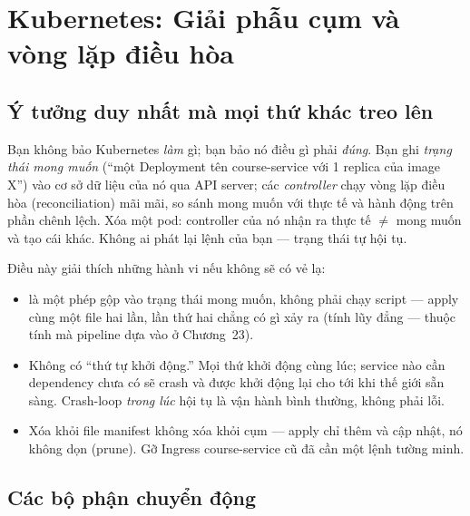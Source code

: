 \chapter{Kubernetes: Giải phẫu cụm và vòng lặp điều hòa}
\label{ch:cluster}

\section{Ý tưởng duy nhất mà mọi thứ khác treo lên}

Bạn không bảo Kubernetes \emph{làm} gì; bạn bảo nó điều gì phải
\emph{đúng}. Bạn ghi \emph{trạng thái mong muốn} (``một Deployment tên
course-service với 1 replica của image X'') vào cơ sở dữ liệu của nó
qua API server; các \emph{controller} chạy vòng lặp điều hòa
(reconciliation) mãi mãi, so sánh mong muốn với thực tế và hành động
trên phần chênh lệch. Xóa một pod: controller của nó nhận ra thực tế
$\neq$ mong muốn và tạo cái khác. Không ai phát lại lệnh của bạn ---
trạng thái tự hội tụ.

Điều này giải thích những hành vi nếu không sẽ có vẻ lạ:

\begin{itemize}
  \item {} là một phép gộp vào trạng thái mong muốn,
  không phải chạy script --- apply cùng một file hai lần, lần thứ hai
  chẳng có gì xảy ra (tính lũy đẳng --- thuộc tính mà pipeline dựa vào
  ở Chương~23).
  \item Không có ``thứ tự khởi động.'' Mọi thứ khởi động cùng lúc;
  service nào cần dependency chưa có sẽ crash và được khởi động lại cho
  tới khi thế giới sẵn sàng. Crash-loop \emph{trong lúc} hội tụ là vận
  hành bình thường, không phải lỗi.
  \item Xóa khỏi file manifest không xóa khỏi cụm --- apply chỉ thêm và
  cập nhật, nó không dọn (prune). Gỡ Ingress course-service cũ đã cần
  một lệnh  tường minh.
\end{itemize}

\section{Các bộ phận chuyển động}

